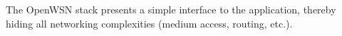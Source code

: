 The Open\+W\+SN stack presents a simple interface to the application, thereby hiding all networking complexities (medium access, routing, etc.). 
